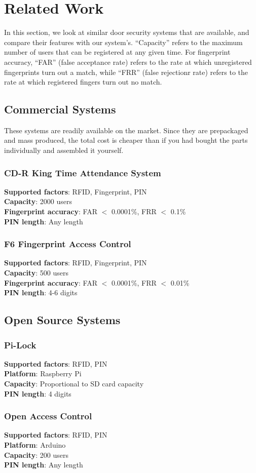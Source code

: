 \section{Related Work}

In this section, we look at similar door security systems that are available, and compare their features with our system's. ``Capacity'' refers to the maximum number of users that can be registered at any given time. For fingerprint accuracy, ``FAR'' (false acceptance rate) refers to the rate at which unregistered fingerprints turn out a match, while ``FRR'' (false rejectionr rate) refers to the rate at which registered fingers turn out no match.

\subsection{Commercial Systems}
These systems are readily available on the market. Since they are prepackaged and mass produced, the total cost is cheaper than if you had bought the parts individually and assembled it yourself.

\subsubsection{CD-R King Time Attendance System}
\textbf{Supported factors}: RFID, Fingerprint, PIN \\
\textbf{Capacity}: 2000 users \\
\textbf{Fingerprint accuracy}: FAR $<$ 0.0001\%, FRR $<$ 0.1\% \\
\textbf{PIN length}: Any length

\subsubsection{F6 Fingerprint Access Control}
\textbf{Supported factors}: RFID, Fingerprint, PIN \\
\textbf{Capacity}: 500 users \\
\textbf{Fingerprint accuracy}: FAR $<$ 0.0001\%, FRR $<$ 0.01\% \\
\textbf{PIN length}: 4-6 digits

\subsection{Open Source Systems}

\subsubsection{Pi-Lock}
\textbf{Supported factors}: RFID, PIN \\
\textbf{Platform}: Raspberry Pi \\
\textbf{Capacity}: Proportional to SD card capacity \\
\textbf{PIN length}: 4 digits

\subsubsection{Open Access Control}
\textbf{Supported factors}: RFID, PIN \\
\textbf{Platform}: Arduino \\
\textbf{Capacity}: 200 users \\
\textbf{PIN length}: Any length